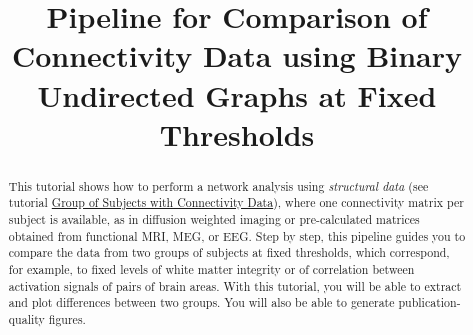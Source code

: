 \documentclass[justified]{tufte-handout}
\title[Comparison of Connectivity Data using BUT]{Pipeline for Comparison of Connectivity Data using Binary Undirected Graphs at Fixed Thresholds}
\begin{document}
\maketitle

\begin{abstract}
\noindent
This tutorial shows how to perform a network analysis using \emph{structural data} (see tutorial \href{https://github.com/braph-software/BRAPH-2/tree/develop/tutorials/data/tut_gr_con}{Group of Subjects with Connectivity Data}), where one connectivity matrix per subject is available, as in diffusion weighted imaging or pre-calculated matrices obtained from functional MRI, MEG, or EEG. Step by step, this pipeline guides you to compare the data from two groups of subjects at fixed thresholds, which correspond, for example, to fixed levels of white matter integrity or of correlation between activation signals of pairs of brain areas.  With this tutorial, you will be able to extract and plot differences between two groups. You will also be able to generate publication-quality figures.
\end{abstract}
\end{document}
